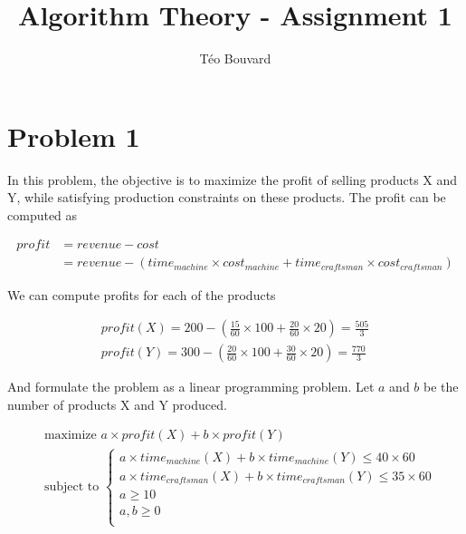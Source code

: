 \documentclass[a4paper, 10pt, twoside]{article}
\begin{document}
\title{Algorithm Theory - Assignment 1}
\author{T\'eo Bouvard}
\maketitle

\section*{Problem 1}
In this problem, the objective is to maximize the profit of selling products X and Y, while satisfying production constraints on these products. The profit can be computed as

\begin{align*}
    profit & = revenue - cost                                                                              \\
           & = revenue - (time_{machine} \times cost_{machine} + time_{craftsman} \times cost_{craftsman})
\end{align*}

We can compute profits for each of the products

\begin{align*}
    profit(X) = 200 - (\frac{15}{60} \times 100 + \frac{20}{60} \times 20) = \frac{505}{3} \\
    profit(Y) = 300 - (\frac{20}{60} \times 100 + \frac{30}{60} \times 20) = \frac{770}{3}
\end{align*}

And formulate the problem as a linear programming problem. Let $a$ and $b$ be the number of products X and Y produced.

\begin{align*}
     & \text{maximize } a \times profit(X) + b \times profit(Y) \\
     & \text{subject to }
    \begin{cases}
        a \times time_{machine}(X) + b \times time_{machine}(Y) \le 40 \times 60     \\
        a \times time_{craftsman}(X) + b \times time_{craftsman}(Y) \le 35 \times 60 \\
        a \ge 10                                                                       \\
        a, b \ge 0                                                                   \\
    \end{cases}
\end{align*}
\end{document}
